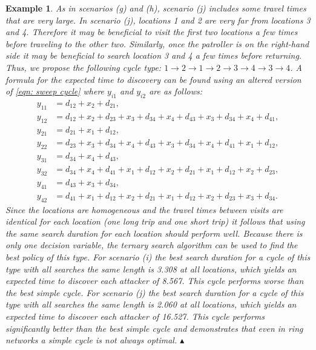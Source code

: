 \documentclass[11pt,a4paper]{article}
\newtheorem{exmp}[theorem]{Example}
\begin{document}
\begin{exmp}
As in scenarios (g) and (h), scenario (j) includes some travel times that are very large.
In scenario (j), locations 1 and 2 are very far from locations 3 and 4.
Therefore it may be beneficial to visit the first two locations a few times before traveling to the other two.
Similarly, once the patroller is on the right-hand side it may be beneficial to search location 3 and 4 a few times before returning.
Thus, we propose the following cycle type: $1 \rightarrow 2 \rightarrow 1 \rightarrow 2 \rightarrow 3 \rightarrow 4 \rightarrow 3 \rightarrow 4$.
A formula for the expected time to discovery can be found using an altered version of \eqref{eqn: sweep cycle} where $y_{i1}$ and $y_{i2}$ are as follows:
\begin{align*}
    y_{11} &= d_{12} + x_2 + d_{21}, \\
    y_{12} &= d_{12} + x_2 + d_{23} + x_3 + d_{34} + x_4 + d_{43} + x_3 + d_{34} + x_4 + d_{41}, \\
    y_{21} &= d_{21} + x_1 + d_{12}, \\
    y_{22} &= d_{23} + x_3 + d_{34} + x_4 + d_{43} + x_3 + d_{34} + x_4 + d_{41} + x_1 + d_{12}, \\
    y_{31} &= d_{34} + x_4 + d_{43}, \\
    y_{32} &= d_{34} + x_4 + d_{41} + x_1 + d_{12} + x_2 + d_{21} + x_1 + d_{12} + x_2 + d_{23}, \\
    y_{41} &= d_{43} + x_3 + d_{34}, \\
    y_{42} &= d_{41} + x_1 + d_{12} + x_2 + d_{21} + x_1 + d_{12} + x_2 + d_{23} + x_3 + d_{34}.
\end{align*}
Since the locations are homogeneous and the travel times between visits are identical for each location (one long trip and one short trip) it follows that using the same search duration for each location should perform well.
Because there is only one decision variable, the ternary search algorithm can be used to find the best policy of this type.
For scenario (i) the best search duration for a cycle of this type with all searches the same length is 3.308 at all locations, which yields an expected time to discover each attacker of 8.567. This cycle performs worse than the best simple cycle.
For scenario (j) the best search duration for a cycle of this type with all searches the same length is 2.060 at all locations, which yields an expected time to discover each attacker of 16.527.
This cycle performs significantly better than the best simple cycle and demonstrates that even in ring networks a simple cycle is not always optimal.
\hfill $\blacktriangle$
\end{exmp}
\end{document}
